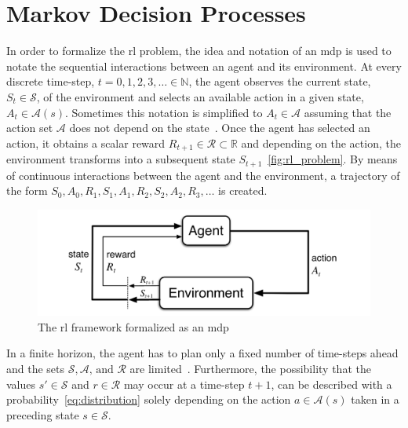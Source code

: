 \documentclass[draft,final]{vutinfth} %
\newcommand{\p}[1]{see p. #1}
\begin{document}
    \section{Markov Decision Processes}\label{sec:markov-decision-processes}
    In order to formalize the \gls{rl} problem, the idea and notation of an \gls{mdp} is used to notate the sequential interactions between an agent and its environment.
    At every discrete time-step, $t = 0,1,2,3, \ldots \in \mathbb{N}$, the agent observes the current state, $S_t \in \mathcal{S}$, of the environment and selects an available action in a given state, $A_t \in \mathcal{A}(s)$.
    Sometimes this notation is simplified to $A_t \in \mathcal{A}$ assuming that the action set $\mathcal{A}$ does not depend on the state~\citep[\p{48}]{sutton_reinforcement_2018}.
    Once the agent has selected an action, it obtains a scalar reward $R_{t+1} \in \mathcal{R} \subset \mathbb{R}$ and depending on the action, the environment transforms into a subsequent state $S_{t+1}$~\eqref{fig:rl_problem}.
    By means of continuous interactions between the agent and the environment, a trajectory of the form $S_0,A_0,R_1,S_1,A_1,R_2,S_2,A_2,R_3,\ldots$ is created.

    \begin{figure}[h]
        \centering
        \includegraphics[width=\textwidth]{figures/rl_problem.png}
        \caption[The \gls{rl} framework formalized as an \gls{mdp}]{The \gls{rl} framework formalized as an \gls{mdp}\protect\footnotemark}
        \label{fig:rl_problem}
    \end{figure}

    \footnotetext{\cite[\p{48}]{sutton_reinforcement_2018}}

    In a finite horizon, the agent has to plan only a fixed number of time-steps ahead and the sets $\mathcal{S},\mathcal{A}\text{, and }\mathcal{R}$ are limited~\citep[\p{47f}]{sutton_reinforcement_2018,kaelbling_reinforcement_1996}.
    Furthermore, the possibility that the values $s'\in \mathcal{S}$ and $r \in \mathcal{R}$ may occur at a time-step $t+1$, can be described with a probability~\eqref{eq:distribution} solely depending on the action $a \in \mathcal{A}(s)$ taken in a preceding state $s \in \mathcal{S}$.
\end{document}
